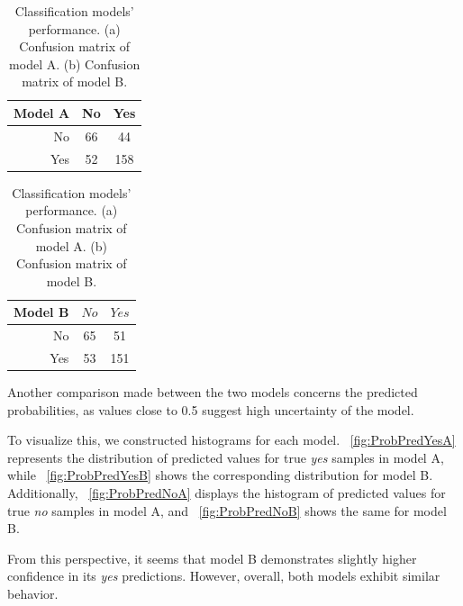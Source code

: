 \begin{table}[h]
	\begin{subtable}{0.4\textwidth}
		\centering
		\begin{tabular}{|| cr | cc ||}    
			\hline
			\multicolumn{2}{|c|}{Model A} 
			& No & Yes \\
			\hline
			\hline
			& No & 66 & 44 \\
			& Yes & 52 & 158 \\
			\hline
		\end{tabular}
		\caption{}
		\label{table:ConfMatModA}
	\end{subtable}
	\hfill
	\begin{subtable}{0.4\textwidth}
		\centering
		\begin{tabular}{|| cr | cc ||}    
			\hline
			\multicolumn{2}{|c|}{Model B} 
			& $No$ & $Yes$ \\
			\hline
			\hline
			& No & 65 & 51 \\
			& Yes & 53 & 151 \\
			\hline
		\end{tabular}
		\caption{}
		\label{table:ConfMatModB}
	\end{subtable}
	\caption{Classification models' performance. (a) Confusion matrix of model A. (b) Confusion matrix of model B.}
	\label{table:ConfMat}
\end{table}


Another comparison made between the two models concerns the predicted probabilities, as values close to 0.5 suggest high uncertainty of the model.

To visualize this, we constructed histograms for each model. \Fig~\ref{fig:ProbPredYesA} represents the distribution of predicted values for true \textit{yes} samples in model A, while \Fig~\ref{fig:ProbPredYesB} shows the corresponding distribution for model B. Additionally, \Fig~\ref{fig:ProbPredNoA} displays the histogram of predicted values for true \textit{no} samples in model A, and \Fig~\ref{fig:ProbPredNoB} shows the same for model B.

From this perspective, it seems that model B demonstrates slightly higher confidence in its \textit{yes} predictions. However, overall, both models exhibit similar behavior.

